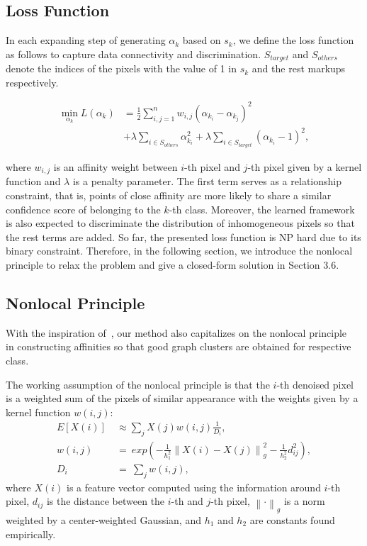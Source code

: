 \documentclass[sigconf]{acmart}
\begin{document}
\subsection{Loss Function}

In each expanding step of generating $\alpha_k$ based on $s_k$, we define the loss function as follows to capture data connectivity and discrimination. $S_{target}$ and $S_{others}$ denote the indices of the pixels with the value of 1 in $s_k$ and the rest markups respectively.

\begin{equation}
\label{eq:1}
\begin{split}
\min_{\alpha_k}L(\alpha_k) &= \frac{1}{2}\sum_{i,j=1}^nw_{i,j}(\alpha_{k_i} - \alpha_{k_j})^2\\&
+ \lambda \sum_{i\in S_{others}}\alpha_{k_i}^2 + \lambda\sum_{i\in S_{target}}(\alpha_{k_i}-1)^2,
\end{split}
\end{equation}

where $w_{i,j}$ is an affinity weight between $i$-th pixel and $j$-th pixel given by a kernel function and $\lambda$ is a penalty parameter. The first term serves as a relationship constraint, that is, points of close affinity are more likely to share a similar confidence score of belonging to the $k$-th class. Moreover, the learned framework is also expected to discriminate the distribution of inhomogeneous pixels so that the rest terms are added. So far, the presented loss function is NP hard due to its binary constraint. Therefore, in the following section, we introduce the nonlocal principle to relax the problem and give a closed-form solution in Section 3.6.

\subsection{Nonlocal Principle}
With the inspiration of~\cite{nonlocalmatting}, our method also capitalizes on the nonlocal principle~\cite{nonlocal} in constructing affinities so that good graph clusters are obtained for respective class.

The working assumption of the nonlocal principle is that the $i$-th denoised pixel is a weighted sum of the pixels of similar appearance with the weights given by a kernel function $w(i,j)$:
\begin{equation}
\begin{split}
E[X(i)]~&\approx\sum_{j} X(j)w(i,j)\frac{1}{D_{i}},\\
w(i,j)~&=~exp(-\frac{1}{h_1^2}\left\|X(i) - X(j)\right\|_g^2 - \frac{1}{h_2^2}d_{ij}^2),\\
D_i~&=~\sum_{j}w(i,j),
\end{split}
\label{eq:3}
\end{equation}
where $X(i)$ is a feature vector computed using the information around $i$-th pixel, $d_{ij}$ is the distance between the $i$-th and $j$-th pixel, $\left\|\cdot\right\|_g$ is a norm weighted by a center-weighted Gaussian, and $h_1$ and $h_2$ are constants found empirically.
\end{document}
